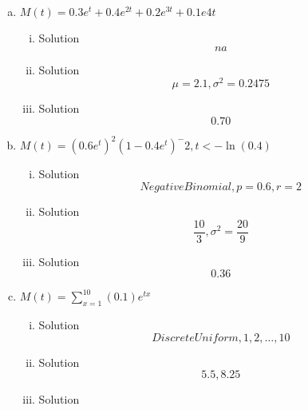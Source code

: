 \documentclass{article}
\begin{document}
\begin{spacing}{1.1}
\begin{homeworkProblem}
\begin{enumerate}[(a)]
\begin{enumerate}[(i)]
			\end{enumerate}
		\item $M(t) = 0.3e^t + 0.4e^{2t} + 0.2e^{3t} + 0.1e{4t}$
			\begin{enumerate}[(i)]
				\item 
					\begin{homeworkSection}{Solution}
						\[na\]
					\end{homeworkSection}
				\item 
					\begin{homeworkSection}{Solution}
						\[ \mu = 2.1, \sigma^2 = 0.2475\]
					\end{homeworkSection}
				\item 
					\begin{homeworkSection}{Solution}
						\[0.70\]
					\end{homeworkSection}
			\end{enumerate}
		\item  $M(t) = (0.6e^t)^2(1-0.4e^t)^-2, t < -\ln(0.4)$
			\begin{enumerate}[(i)]
				\item 
					\begin{homeworkSection}{Solution}
						\[Negative Binomial, p = 0.6, r = 2\]
					\end{homeworkSection}
				\item 
					\begin{homeworkSection}{Solution}
						\[ \frac {10}{3}, \sigma^2 = \frac{20}{9}\]
					\end{homeworkSection}
				\item 
					\begin{homeworkSection}{Solution}
						\[0.36\]
					\end{homeworkSection}
			\end{enumerate}
		\item $M(t) = \sum\nolimits_{x = 1}^{10} {(0.1){e^{tx}}} $
			\begin{enumerate}[(i)]
				\item 
					\begin{homeworkSection}{Solution}
						\[Discrete Uniform, 1,2, \dots, 10 \]
					\end{homeworkSection}
				\item 
					\begin{homeworkSection}{Solution}
						\[5.5, 8.25\]
					\end{homeworkSection}
				\item 
					\begin{homeworkSection}{Solution}

\end{homeworkSection}
\end{enumerate}
\end{enumerate}
\end{homeworkProblem}
\end{spacing}
\end{document}
